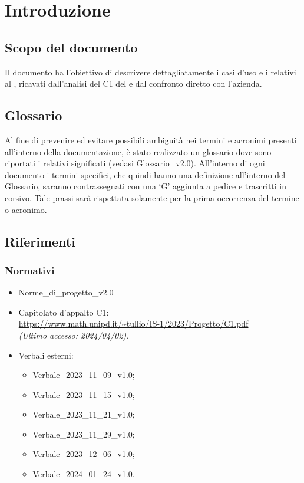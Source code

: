 \chapter{Introduzione} \label{cap:intro}
\section{Scopo del documento}
Il documento ha l'obiettivo di descrivere dettagliatamente i casi d’uso e i  relativi al   , ricavati dall’analisi del  C1 del   e dal confronto diretto con l'azienda.
\section{Glossario}
Al fine di prevenire ed evitare possibili ambiguità nei termini e acronimi presenti all’interno della documentazione, è stato realizzato un glossario dove sono riportati i relativi significati (vedasi Glossario\_v2.0). All’interno di ogni documento i termini specifici, che quindi hanno una definizione all’interno del Glossario, saranno contrassegnati con una ‘G’ aggiunta a pedice e trascritti in corsivo. Tale prassi sarà rispettata solamente per la prima occorrenza del termine o acronimo.
\section{Riferimenti}
\subsection{Normativi}
\begin{itemize}
    \item Norme\_di\_progetto\_v2.0
    \item Capitolato d'appalto C1: \\ \url{https://www.math.unipd.it/~tullio/IS-1/2023/Progetto/C1.pdf} \\ \textit{(Ultimo accesso: 2024/04/02)}.
    \item Verbali esterni:
        \begin{itemize}
            \item Verbale\_2023\_11\_09\_v1.0;
            \item Verbale\_2023\_11\_15\_v1.0;
            \item Verbale\_2023\_11\_21\_v1.0;
            \item Verbale\_2023\_11\_29\_v1.0;
            \item Verbale\_2023\_12\_06\_v1.0;
            \item Verbale\_2024\_01\_24\_v1.0.
        \end{itemize}
\end{itemize}

